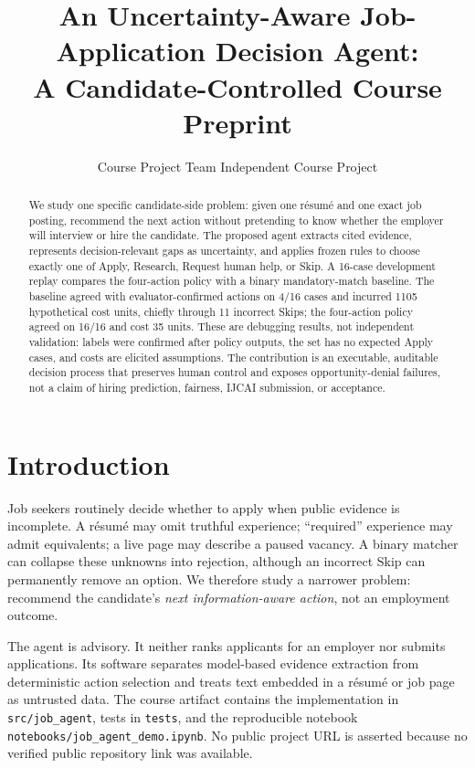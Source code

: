 \documentclass{article}
\title{An Uncertainty-Aware Job-Application Decision Agent:\\A Candidate-Controlled Course Preprint}
\author{Course Project Team
\affiliations
Independent Course Project\\}
\begin{document}
\maketitle

\begin{abstract}
We study one specific candidate-side problem: given one r\'esum\'e and one exact job posting, recommend the next action without pretending to know whether the employer will interview or hire the candidate. The proposed agent extracts cited evidence, represents decision-relevant gaps as uncertainty, and applies frozen rules to choose exactly one of Apply, Research, Request human help, or Skip. A 16-case development replay compares the four-action policy with a binary mandatory-match baseline. The baseline agreed with evaluator-confirmed actions on 4/16 cases and incurred 1105 hypothetical cost units, chiefly through 11 incorrect Skips; the four-action policy agreed on 16/16 and cost 35 units. These are debugging results, not independent validation: labels were confirmed after policy outputs, the set has no expected Apply cases, and costs are elicited assumptions. The contribution is an executable, auditable decision process that preserves human control and exposes opportunity-denial failures, not a claim of hiring prediction, fairness, IJCAI submission, or acceptance.
\end{abstract}

\section{Introduction}
Job seekers routinely decide whether to apply when public evidence is incomplete. A r\'esum\'e may omit truthful experience; ``required'' experience may admit equivalents; a live page may describe a paused vacancy. A binary matcher can collapse these unknowns into rejection, although an incorrect Skip can permanently remove an option. We therefore study a narrower problem: recommend the candidate's \emph{next information-aware action}, not an employment outcome.

The agent is advisory. It neither ranks applicants for an employer nor submits applications. Its software separates model-based evidence extraction from deterministic action selection and treats text embedded in a r\'esum\'e or job page as untrusted data. The course artifact contains the implementation in \texttt{src/job\_agent}, tests in \texttt{tests}, and the reproducible notebook \texttt{notebooks/job\_agent\_demo.ipynb}. No public project URL is asserted because no verified public repository link was available.
\end{document}

